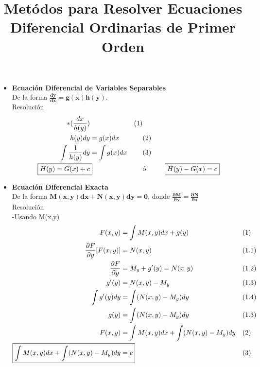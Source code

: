 \documentclass{article}
\title{Metódos para Resolver Ecuaciones Diferencial Ordinarias de Primer Orden}
\begin{document}
\maketitle

\begin{itemize}
    \item \textbf{Ecuación Diferencial de Variables Separables} \\
    De la forma $\boldsymbol{\frac{dy}{dx} = g(x)h(y)}$. \\
    Resolución
    \begin{align*}
        [ \frac{dy}{dx} & = g(x)h(y) ]*(\frac{dx}{h(y)}) &&\text{(1)}\\
        h(y)dy & = g(x)dx &&\text{(2)}\\
        \int \frac{1}{h(y)} dy & = \int g(x)dx &&\text{(3)}\\
        \Aboxed{ H(y) = G(x) + c } &&\text{ó} && \Aboxed{ H(y) - G(x) = c }
    \end{align*}
    
    \item \textbf{Ecuación Diferencial Exacta} \\
    De la forma $\boldsymbol{M(x,y)dx + N(x,y)dy = 0}$, donde 
    \textbf{$\boldsymbol{\frac{\partial M}{\partial y} = \frac{\partial N}{\partial x}}$} \\
    Resolución \\
    -Usando M(x,y)
    \begin{align*}
        F(x,y) & = \int M(x,y) dx + g(y) &&\text{(1)}\\
        \frac{\partial F}{\partial y}[F(x,y)] & = N(x,y) &&\text{(1.1)}\\
        \frac{\partial F}{\partial y} & = M_y + g'(y) = N(x,y) &&\text{(1.2)}\\
        g'(y) & = N(x,y) - M_y &&\text{(1.3)}\\
        \int g'(y) dy & = \int (N(x,y) - M_y) dy &&\text{(1.4)}\\
        g(y) & = \int (N(x,y) - M_y) dy &&\text{(1.3)}\\
        F(x,y) & = \int M(x,y) dx + \int (N(x,y) - M_y) dy &&\text{(2)}\\
        \Aboxed{ \int M(x,y) dx + \int (N(x,y) - M_y) dy & = c } &&\text{(3)}
    \end{align*}


\end{itemize}
\end{document}
